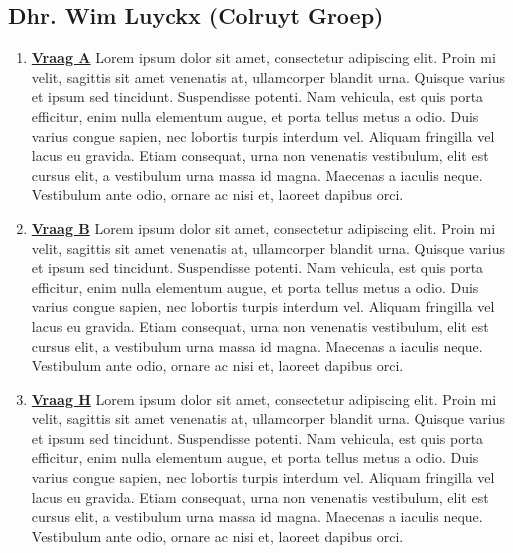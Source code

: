 \documentclass{hogent-article}
\begin{document}
\subsection{Dhr. Wim Luyckx (Colruyt Groep)}

\vspace{5pt}

\begin{enumerate}
    \item \textbf{\underline{Vraag A}}\vspace{5pt}\newline
    Lorem ipsum dolor sit amet, consectetur adipiscing elit. Proin mi velit, sagittis sit amet venenatis at, ullamcorper blandit urna. Quisque varius et ipsum sed tincidunt. Suspendisse potenti. Nam vehicula, est quis porta efficitur, enim nulla elementum augue, et porta tellus metus a odio. Duis varius congue sapien, nec lobortis turpis interdum vel. Aliquam fringilla vel lacus eu gravida. Etiam consequat, urna non venenatis vestibulum, elit est cursus elit, a vestibulum urna massa id magna. Maecenas a iaculis neque. Vestibulum ante odio, ornare ac nisi et, laoreet dapibus orci.
  \vspace{5pt}
    \item \textbf{\underline{Vraag B}}\vspace{5pt}\newline
    Lorem ipsum dolor sit amet, consectetur adipiscing elit. Proin mi velit, sagittis sit amet venenatis at, ullamcorper blandit urna. Quisque varius et ipsum sed tincidunt. Suspendisse potenti. Nam vehicula, est quis porta efficitur, enim nulla elementum augue, et porta tellus metus a odio. Duis varius congue sapien, nec lobortis turpis interdum vel. Aliquam fringilla vel lacus eu gravida. Etiam consequat, urna non venenatis vestibulum, elit est cursus elit, a vestibulum urna massa id magna. Maecenas a iaculis neque. Vestibulum ante odio, ornare ac nisi et, laoreet dapibus orci.
  \vspace{5pt}
    \item \textbf{\underline{Vraag H}}\vspace{5pt}\newline
    Lorem ipsum dolor sit amet, consectetur adipiscing elit. Proin mi velit, sagittis sit amet venenatis at, ullamcorper blandit urna. Quisque varius et ipsum sed tincidunt. Suspendisse potenti. Nam vehicula, est quis porta efficitur, enim nulla elementum augue, et porta tellus metus a odio. Duis varius congue sapien, nec lobortis turpis interdum vel. Aliquam fringilla vel lacus eu gravida. Etiam consequat, urna non venenatis vestibulum, elit est cursus elit, a vestibulum urna massa id magna. Maecenas a iaculis neque. Vestibulum ante odio, ornare ac nisi et, laoreet dapibus orci.
\end{enumerate}
\end{document}
